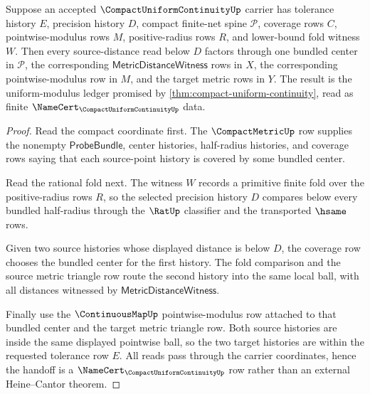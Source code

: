 \begin{theorem}
\label{thm:compact-uniform-continuity-finite-net-handoff}
Suppose an accepted $\CompactUniformContinuityUp$ carrier has tolerance history $E$, precision history $D$, compact finite-net spine $\mathcal{P}$, coverage rows $C$, pointwise-modulus rows $M$, positive-radius rows $R$, and lower-bound fold witness $W$. Then every source-distance read below $D$ factors through one bundled center in $\mathcal{P}$, the corresponding $\mathsf{MetricDistanceWitness}$ rows in $X$, the corresponding pointwise-modulus row in $M$, and the target metric rows in $Y$. The result is the uniform-modulus ledger promised by \autoref{thm:compact-uniform-continuity}, read as finite $\NameCert_{\CompactUniformContinuityUp}$ data.
\end{theorem}
\begin{proof}
Read the compact coordinate first. The $\CompactMetricUp$ row supplies the nonempty $\mathsf{ProbeBundle}$, center histories, half-radius histories, and coverage rows saying that each source-point history is covered by some bundled center.

Read the rational fold next. The witness $W$ records a primitive finite fold over the positive-radius rows $R$, so the selected precision history $D$ compares below every bundled half-radius through the $\RatUp$ classifier and the transported $\hsame$ rows.

Given two source histories whose displayed distance is below $D$, the coverage row chooses the bundled center for the first history. The fold comparison and the source metric triangle row route the second history into the same local ball, with all distances witnessed by $\mathsf{MetricDistanceWitness}$.

Finally use the $\ContinuousMapUp$ pointwise-modulus row attached to that bundled center and the target metric triangle row. Both source histories are inside the same displayed pointwise ball, so the two target histories are within the requested tolerance row $E$. All reads pass through the carrier coordinates, hence the handoff is a $\NameCert_{\CompactUniformContinuityUp}$ row rather than an external Heine--Cantor theorem.
\end{proof}

